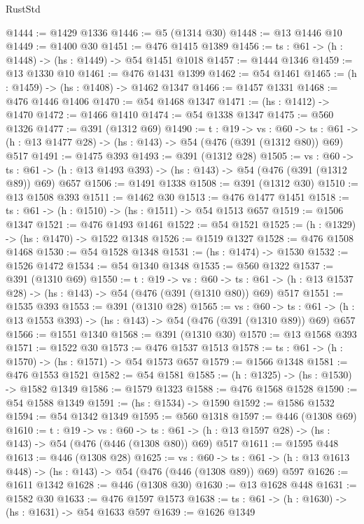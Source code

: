 \begin{lexlean}{RustStd}
\begin{coremodule}
{\begin{coremodule}
{{{{{{{{{{{{{{{{{{{{{{{{{{{{{{{{{{{{{{@1444 := @1429 @1336
@1446 := @5 (@1314 @30)
@1448 := @13 @1446 @10
@1449 := @1400 @30
@1451 := @476 @1415 @1389
@1456 := {ts : @61} -> (h : @1448) -> (hs : @1449) -> @54 @1451 @1018
@1457 := @1444 @1346
@1459 := @13 @1330 @10
@1461 := @476 @1431 @1399
@1462 := @54 @1461
@1465 := (h : @1459) -> (hs : @1408) -> @1462 @1347
@1466 := @1457 @1331
@1468 := @476 @1446 @1406
@1470 := @54 @1468 @1347
@1471 := (hs : @1412) -> @1470
@1472 := @1466 @1410
@1474 := @54 @1338 @1347
@1475 := @560 @1326
@1477 := @391 (@1312 @69)
@1490 := {t : @19} ->
  {vs : @60} ->
  {ts : @61} -> (h : @13 @1477 @28) -> (hs : @143) -> @54 (@476 (@391 (@1312 @80)) @69) @517
@1491 := @1475 @393
@1493 := @391 (@1312 @28)
@1505 := {vs : @60} ->
  {ts : @61} -> (h : @13 @1493 @393) -> (hs : @143) -> @54 (@476 (@391 (@1312 @89)) @69) @657
@1506 := @1491 @1338
@1508 := @391 (@1312 @30)
@1510 := @13 @1508 @393
@1511 := @1462 @30
@1513 := @476 @1477 @1451
@1518 := {ts : @61} -> (h : @1510) -> (hs : @1511) -> @54 @1513 @657
@1519 := @1506 @1347
@1521 := @476 @1493 @1461
@1522 := @54 @1521
@1525 := (h : @1329) -> (hs : @1470) -> @1522 @1348
@1526 := @1519 @1327
@1528 := @476 @1508 @1468
@1530 := @54 @1528 @1348
@1531 := (hs : @1474) -> @1530
@1532 := @1526 @1472
@1534 := @54 @1340 @1348
@1535 := @560 @1322
@1537 := @391 (@1310 @69)
@1550 := {t : @19} ->
  {vs : @60} ->
  {ts : @61} -> (h : @13 @1537 @28) -> (hs : @143) -> @54 (@476 (@391 (@1310 @80)) @69) @517
@1551 := @1535 @393
@1553 := @391 (@1310 @28)
@1565 := {vs : @60} ->
  {ts : @61} -> (h : @13 @1553 @393) -> (hs : @143) -> @54 (@476 (@391 (@1310 @89)) @69) @657
@1566 := @1551 @1340
@1568 := @391 (@1310 @30)
@1570 := @13 @1568 @393
@1571 := @1522 @30
@1573 := @476 @1537 @1513
@1578 := {ts : @61} -> (h : @1570) -> (hs : @1571) -> @54 @1573 @657
@1579 := @1566 @1348
@1581 := @476 @1553 @1521
@1582 := @54 @1581
@1585 := (h : @1325) -> (hs : @1530) -> @1582 @1349
@1586 := @1579 @1323
@1588 := @476 @1568 @1528
@1590 := @54 @1588 @1349
@1591 := (hs : @1534) -> @1590
@1592 := @1586 @1532
@1594 := @54 @1342 @1349
@1595 := @560 @1318
@1597 := @446 (@1308 @69)
@1610 := {t : @19} ->
  {vs : @60} ->
  {ts : @61} -> (h : @13 @1597 @28) -> (hs : @143) -> @54 (@476 (@446 (@1308 @80)) @69) @517
@1611 := @1595 @448
@1613 := @446 (@1308 @28)
@1625 := {vs : @60} ->
  {ts : @61} -> (h : @13 @1613 @448) -> (hs : @143) -> @54 (@476 (@446 (@1308 @89)) @69) @597
@1626 := @1611 @1342
@1628 := @446 (@1308 @30)
@1630 := @13 @1628 @448
@1631 := @1582 @30
@1633 := @476 @1597 @1573
@1638 := {ts : @61} -> (h : @1630) -> (hs : @1631) -> @54 @1633 @597
@1639 := @1626 @1349
}}}}}}}}}}}}}}}}}}}}}}}}}}}}}}}}}}}}}}
\end{coremodule}}
\end{coremodule}
\end{lexlean}

